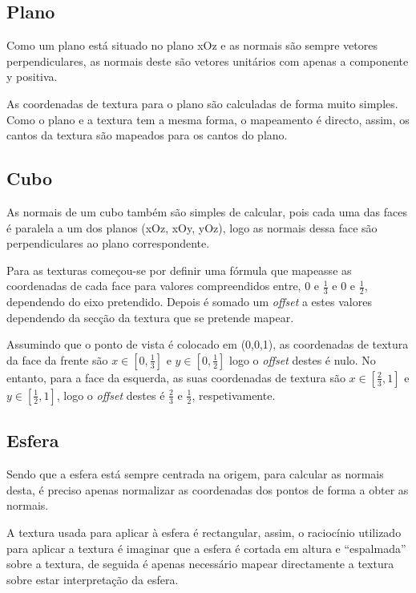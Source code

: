 \documentclass[a4paper]{article}
\begin{document}
\subsection{Plano}
Como um plano está situado no plano xOz e as normais são sempre vetores
perpendiculares, as normais deste são vetores unitários com apenas a componente
y positiva.

As coordenadas de textura para o plano são calculadas de forma
muito simples. Como o plano e a textura tem a mesma forma, o mapeamento é
directo, assim, os cantos da textura são mapeados para os cantos do plano.

\subsection{Cubo}
As normais de um cubo também são simples de calcular, pois cada uma das faces é
paralela a um dos planos (xOz, xOy, yOz), logo as normais dessa face são
perpendiculares ao plano correspondente.

Para as texturas começou-se por definir uma fórmula que mapeasse as coordenadas
de cada face para valores compreendidos entre, 0 e $\frac{1}{3}$ e 0 e
$\frac{1}{2}$, dependendo do eixo pretendido. Depois é somado um
\textit{offset} a estes valores dependendo da secção da textura que se pretende
mapear.

Assumindo que o ponto de vista é colocado em (0,0,1), as coordenadas de textura
da face da frente são $x \in [0,\frac{1}{3}]$ e $y \in [0,\frac{1}{2}]$ logo o
\textit{offset} destes é nulo. No entanto, para a face da esquerda, as suas
coordenadas de textura são $x \in [\frac{2}{3},1]$ e $y \in [\frac{1}{2},1]$,
logo o \textit{offset} destes é $\frac{2}{3}$ e $\frac{1}{2}$, respetivamente.


\subsection{Esfera}\label{sec:esfera}
Sendo que a esfera está sempre centrada na origem, para calcular as normais
desta, é preciso apenas normalizar as coordenadas dos pontos de forma a obter
as normais.

A textura usada para aplicar à esfera é rectangular, assim, o raciocínio
utilizado para aplicar a textura é imaginar que a esfera é cortada em altura e
``espalmada'' sobre a textura, de seguida é apenas necessário mapear
directamente a textura sobre estar interpretação da esfera.
\end{document}
